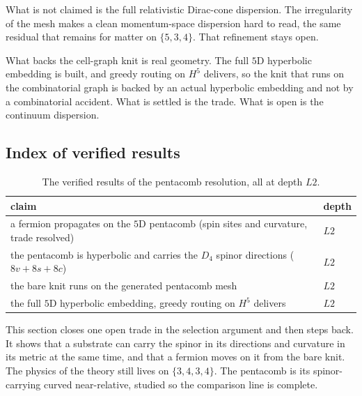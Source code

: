 What is not claimed is the full relativistic Dirac-cone dispersion. The irregularity
of the mesh makes a clean momentum-space dispersion hard to read, the same residual
that remains for matter on $\{5,3,4\}$. That refinement stays open.

What backs the cell-graph knit is real geometry. The full $5$D hyperbolic embedding
is built, and greedy routing on $H^5$ delivers, so the knit that runs on the
combinatorial graph is backed by an actual hyperbolic embedding and not by a
combinatorial accident. What is settled is the trade. What is open is the continuum
dispersion.

\subsection{Index of verified results}

\begin{table}[ht]
\centering
\begin{tabular}{@{}ll@{}}
\toprule
claim & depth \\
\midrule
a fermion propagates on the $5$D pentacomb (spin sites and curvature, trade resolved) & $L2$ \\
the pentacomb is hyperbolic and carries the $D_4$ spinor directions ($8v + 8s + 8c$) & $L2$ \\
the bare knit runs on the generated pentacomb mesh & $L2$ \\
the full $5$D hyperbolic embedding, greedy routing on $H^5$ delivers & $L2$ \\
\bottomrule
\end{tabular}
\caption{The verified results of the pentacomb resolution, all at depth $L2$.}
\label{tab:pentacomb-index}
\end{table}

This section closes one open trade in the selection argument and then steps back. It
shows that a substrate can carry the spinor in its directions and curvature in its
metric at the same time, and that a fermion moves on it from the bare knit. The
physics of the theory still lives on $\{3,4,3,4\}$. The pentacomb is its
spinor-carrying curved near-relative, studied so the comparison line is complete.
